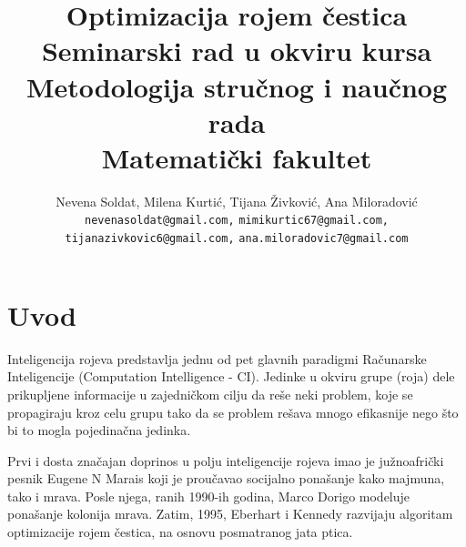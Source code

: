 \documentclass[a4paper]{article}
\begin{document}
\title{Optimizacija rojem čestica\\ \small{Seminarski rad u okviru kursa\\Metodologija stručnog i naučnog rada\\ Matematički fakultet}}

\author{Nevena Soldat, Milena Kurtić, Tijana Živković, Ana Miloradović\protect\\
\small{\texttt{nevenasoldat@gmail.com,}  \texttt{mimikurtic67@gmail.com,}} \\ \small{\texttt{tijanazivkovic6@gmail.com,} \texttt{ana.miloradovic7@gmail.com}}}


\maketitle


\tableofcontents

\newpage

\section{Uvod}
\label{sec:uvod}

Inteligencija rojeva predstavlja jednu od pet glavnih paradigmi Računarske Inteligencije (Computation Intelligence - CI). Jedinke u okviru grupe (roja) dele prikupljene informacije u zajedničkom cilju da reše neki problem, koje se propagiraju kroz celu grupu tako da se problem rešava mnogo efikasnije nego što bi to mogla pojedinačna jedinka.

Prvi i dosta značajan doprinos u polju inteligencije rojeva imao je južnoafrički pesnik Eugene N Marais koji je proučavao socijalno ponašanje kako majmuna, tako i mrava. Posle njega, ranih 1990-ih godina, Marco Dorigo modeluje ponašanje kolonija mrava. Zatim, 1995, Eberhart i Kennedy razvijaju algoritam optimizacije rojem čestica, na osnovu posmatranog jata ptica.
\end{document}
